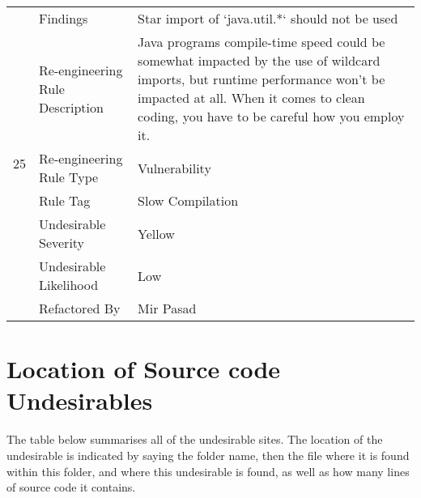 \documentclass[12pt,english]{article}
\begin{document}
\begin{table}[!ht]
    \begin{tabularx}{\textwidth}{|c|l|X|}
    \hline
        \multirow{7}{*}{25} & Findings & Star import of ‘java.util.*‘ should not be used \\ \cline{2-3}
        & Re-engineering Rule Description & Java programs compile-time speed could be somewhat impacted by the use of wildcard imports, but runtime performance won't be impacted at all. When it comes to clean coding, you have to be careful how you employ it.
 \\ \cline{2-3}
        & Re-engineering Rule Type & Vulnerability \\ \cline{2-3}
        & Rule Tag & Slow Compilation \\ \cline{2-3}
        & Undesirable Severity & Yellow \\ \cline{2-3}
        & Undesirable Likelihood & Low \\ \cline{2-3}
        & Refactored By & Mir Pasad \\ \hline
    \end{tabularx}
\end{table}

\clearpage
\newpage

\section{ Location of Source code Undesirables}
The table below summarises all of the undesirable sites. The location of the undesirable is indicated by saying the folder name, then the file where it is found within this folder, and where this undesirable is found, as well as how many lines of source code it contains.
\end{document}
